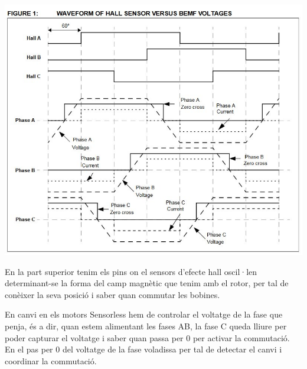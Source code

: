 \includegraphics[width=\textwidth]{Motors/BLDC_DC_Motor_Sensorless_Trapezoidal_waveform}

En la part superior tenim els pins on el sensors d'efecte hall oscil·len determinant-se la forma del camp magnètic que tenim amb el rotor, per tal de conèixer la seva posició i saber quan commutar les bobines.

En canvi en els motors Sensorless hem de controlar el voltatge de la fase que penja, és a dir, quan estem alimentant les fases AB, la fase C queda lliure per poder capturar el voltatge i saber quan passa per 0 per activar la commutació. En el pas per 0 del voltatge de la fase voladissa per tal de detectar el canvi i coordinar la commutació.

